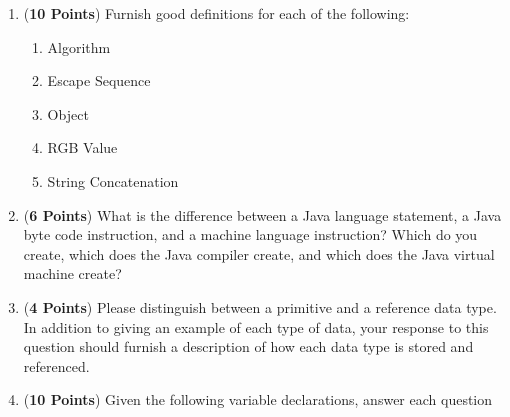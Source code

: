 \documentclass[12pt]{article}
\begin{document}
\begin{enumerate}

  \item ({\bf 10 Points}) Furnish good definitions for each of the following:

\begin{enumerate}

\item Algorithm
  \vspace*{1.2in}

\item Escape Sequence 
  \vspace*{1.2in}

\item Object
  \vspace*{1.2in}

\item RGB Value
  \vspace*{1.2in}

\item String Concatenation
  \vspace*{1.2in}

\end{enumerate}



\newpage

\item ({\bf 6 Points}) What is the difference between a Java language statement, a Java byte code instruction, and a
  machine language instruction?  Which do you create, which does the Java compiler create, and which does the Java
  virtual machine create?
  \vspace*{4in}

\item ({\bf 4 Points}) Please distinguish between a primitive and a reference data type.  In addition to giving an
  example of each type of data,  your response to this question should furnish a description of how each data type is
  stored and referenced.  
  
  \newpage

\item ({\bf 10 Points}) Given the following variable declarations, answer each question


\end{enumerate}
\end{document}
